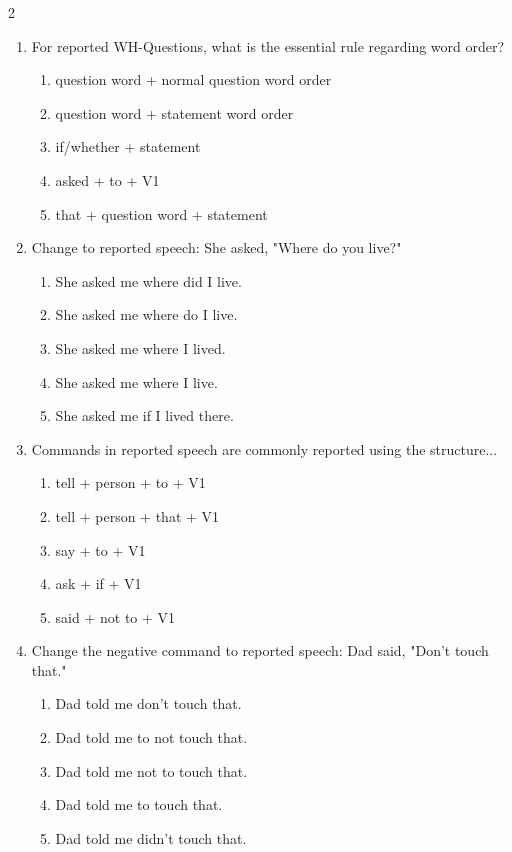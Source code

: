 \documentclass[10pt,a4paper]{article}
\begin{document}
\begin{multicols}{2}
\begin{enumerate}
    \item For reported WH-Questions, what is the essential rule regarding word order?
    \begin{enumerate}
      \item question word + normal question word order
      \item question word + statement word order
      \item if/whether + statement
      \item asked + to + V1
      \item that + question word + statement
    \end{enumerate}

    \item Change to reported speech: She asked, "Where do you live?"
    \begin{enumerate}
      \item She asked me where did I live.
      \item She asked me where do I live.
      \item She asked me where I lived.
      \item She asked me where I live.
      \item She asked me if I lived there.
    \end{enumerate}

    \item Commands in reported speech are commonly reported using the structure...
    \begin{enumerate}
      \item tell + person + to + V1
      \item tell + person + that + V1
      \item say + to + V1
      \item ask + if + V1
      \item said + not to + V1
    \end{enumerate}

    \item Change the negative command to reported speech: Dad said, "Don't touch that."
    \begin{enumerate}
      \item Dad told me don't touch that.
      \item Dad told me to not touch that.
      \item Dad told me not to touch that.
      \item Dad told me to touch that.
      \item Dad told me didn't touch that.
    \end{enumerate}


\end{enumerate}
\end{multicols}
\end{document}
